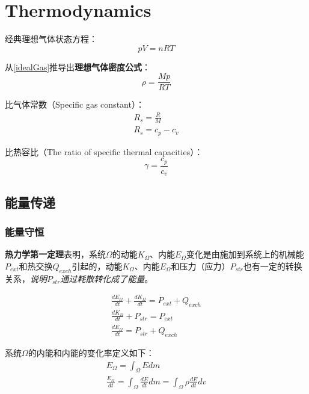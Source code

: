 \chapter{Thermodynamics}

经典理想气体状态方程：
\begin{equation}
\label{idealGas}
pV=nRT
\end{equation}

从\autoref{idealGas}推导出\textbf{理想气体密度公式}：
\begin{equation}
\rho = \frac{Mp}{RT}
\end{equation}

比气体常数（Specific gas constant）：
\begin{gather}
R_s = \frac{R}{M} \\
R_s = c_p - c_v
\end{gather}

比热容比（The ratio of specific thermal capacities）：
\begin{equation}
\gamma = \frac{c_p}{c_v}
\end{equation}

\section{能量传递}

\subsection{能量守恒}
\textbf{热力学第一定理}表明，系统$\Omega$的动能$K_{\Omega}$、内能$E_{\Omega}$变化是由施加到系统上的机械能$P_{ext}$和热交换$Q_{exch}$引起的，动能$K_{\Omega}$、内能$E_{\Omega}$和压力（应力）$P_{str}$也有一定的转换关系，\textit{说明$P_{str}$通过耗散转化成了能量}。

\begin{gather}
    \frac{dE_{\Omega}}{dt} + \frac{dK_{\Omega}}{dt} = P_{ext} + Q_{exch} \\
    \frac{dK_{\Omega}}{dt} + P_{str} = P_{ext} \\
    \frac{dE_{\Omega}}{dt} = P_{str} + Q_{exch}
\end{gather}

系统$\Omega$的内能和内能的变化率定义如下：
\begin{gather}
    E_{\Omega} = \int_{\Omega} E dm \\
    \frac{E_{\Omega}}{dt} = \int_{\Omega} \frac{dE}{dt} dm = \int_{\Omega} \rho \frac{dE}{dt} dv
\end{gather}

